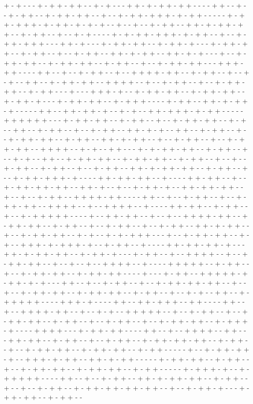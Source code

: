 + - + - - - + - + + - + + - - + - + - - - + + - + - + + - + + - - - - + + - - + - - + - + + - - + - + + - + + - - + - - + - + + - + + + - + - + + - - - - - + - + + - + + + - + - + + - + - + - + - - + - - + - - + - + + - - + + - + - + + - + + - - + - + + - - + - - + - + - - - - + - + - + + - + + + - + - + + - - + - - + - + + - + + + - - - + + - + - - - + - + + - + + - - + - + + - + - - - + - + + - + + - - + - + + - - + - - + - + + - - + + - + - + + - - + + - + - + - - - + - - + - + + - + + - - + - + + - + + - - + - + + - - + - - + - + + - + + - - - + + + - + + - - - - + + - - + - - + - + + - - + - - + + + + - + + - - + - + + - - + - - + - + - - + + - - + - + + - + + - - + + + + - - + - - + - + + - - + - - + - + + - + + - - + - + + - - - + - - - + + + - + - - + - + + - + + - - + - + + - + + - - + - + + - + - - - + - + + - + + - - + - + + + - - - - + - + + - - + + - + - + + - + - - - - - + + - - + + - + + - + - - + - + - - + + - + + + - + - + + - - - - - + + + + + + - - - + - + + - + + - - + - + + - - + - - + - + + - + + - - + - + - - + + - - + - + + - - + - - + - + + - - + + - + - + - - + + - - + - + + - - + - - + - + + - + + - - + - + + - - + + - + - + + - - + - - + - + + - - + - - + - + + - + + - - + + + + - - + - + - - + + - - - + - + - + + - + + - - + - + + - - + - - + - + - - + + - - + - + + - + + - - + - + + - + + - - + - + + - - + - - + - - + - + + - - + - + + - - + - - + - + + - - + + - + - + + - + + - - + - + + - - + - - + - + + - + + + - + - - - - + + - + + - + + - - + - - - - + + - + + - - + - - + - + + - + + - + + - - + + - + - - + - - + - + + - + - - + + - + + - + + - - + - - + - - + - + + - - + + + + - + + - - - - + + - - + - - + - + + - - + - - + - + + - + + - - + + + + - - + - - + + + + - - + - - - - + + - + + - - + - + + - - + - - + - + + + + + - - - - + - - + + - + + - - + - - + - - + + + + - + + - - + - + + - + + - - + - + + - - + - - + - + + - - + - - + - + + - - + + - + - + + - - + - - + - + + - + + - - + - + - - + - + - + + + - - - + - - + - + + - + + - - + - + - - + + + - + - + + + - + - - + - + + - - + - - - - + + - + + - + + - + - - - + + - + - + + - + + - - + - + + - + - - - + - + + - - + - - + + + + - - + - - + - + + - + + - - + - - + - - + - - + + + + - - + - - - - + + + + + - - + - + + - - + - - + - + + - + + - - + - + + - + + - - - - + - - - + - + + - - + + + + + - + - + + - + - + - - - + + - - + - - + - + + - - + - - + - + + - + + - + + - - + - - + - - + - + + - + + - - + - + + - + + - - + - + + - - + - - + - + - - + + - - + - + + + + + - - - - + + + - + - - - - + + - - + + - + + + - - + + - - - - + + - - + - - + + + + - + + - - + - - + - + - - + + + + + - - + - - + - + + - - + - - + - + + - + + - - + - + + - - + - - + - + + - - + - - + - + + - + + - - + - + + + - + - - - - + + + + - - - + - + + - + + - - - - + + - - + - - + + + + - - + + - - - + + - + + - - + - + + - - + - - + - + + - - + - + + - + + - + + - - + - + + - - + - - + - + + - + + - - + - + + - + + - - + - + + - - - - - + - - + - + + - + + - + - - + + + - + - + + - - + + - + - + + - - - - - + - + + - + + - - + - + + - - + - - + - + + - + + - - + - + + - + + - - + - + + - - - - - + - + + + - + - - + - + + + + + - - - - + + - - + - - + - + + - - + + - + - + + - + + - - + - + + - - + - - + - - + - + + - - + - + + - + + - + + - + + - - + - - + - + + - + - - - + - + + - + + - - + - + + - - 
